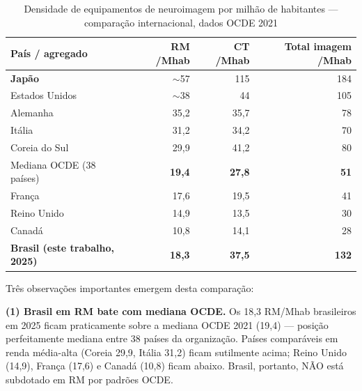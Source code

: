 \documentclass[12pt,a4paper,oneside]{article}
\begin{document}
\begin{table}[H]
\centering
\caption{Densidade de equipamentos de neuroimagem por milhão de habitantes — comparação internacional, dados OCDE 2021}
\begin{tabular}{lrrr}
\toprule
\textbf{País / agregado} & \textbf{RM /Mhab} & \textbf{CT /Mhab} & \textbf{Total imagem /Mhab} \\
\midrule
\textbf{Japão}            & $\sim$57   & 115    & 184 \\
Estados Unidos              & $\sim$38   & 44     & 105 \\
Alemanha                    & 35,2       & 35,7   & 78  \\
Itália                      & 31,2       & 34,2   & 70  \\
Coreia do Sul               & 29,9       & 41,2   & 80  \\
Mediana OCDE (38 países)   & \textbf{19,4} & \textbf{27,8} & \textbf{51} \\
França                      & 17,6       & 19,5   & 41  \\
Reino Unido                 & 14,9       & 13,5   & 30  \\
Canadá                      & 10,8       & 14,1   & 28  \\
\midrule
\textbf{Brasil (este trabalho, 2025)} & \textbf{18,3} & \textbf{37,5} & \textbf{132} \\
\bottomrule
\end{tabular}
\par{}
\label{tab:internacional}
\end{table}

Três observações importantes emergem desta comparação:

\textbf{(1) Brasil em RM bate com mediana OCDE.} Os 18,3 RM/Mhab
brasileiros em 2025 ficam praticamente sobre a mediana OCDE 2021
(19,4) — posição perfeitamente mediana entre 38 países da
organização. Países comparáveis em renda média-alta (Coreia 29,9,
Itália 31,2) ficam sutilmente acima; Reino Unido (14,9), França
(17,6) e Canadá (10,8) ficam abaixo. Brasil, portanto, NÃO está
subdotado em RM por padrões OCDE.
\end{document}
